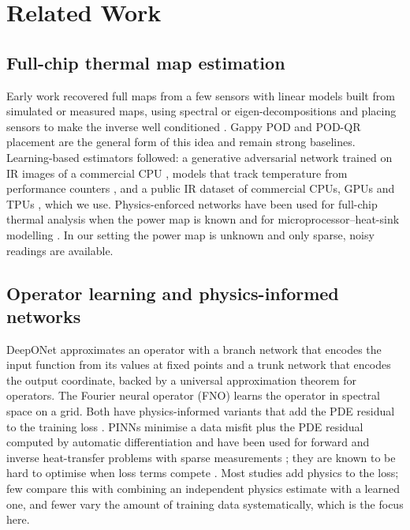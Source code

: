 \documentclass[journal]{IEEEtran}
\begin{document}
\section{Related Work}\label{sec:related}

\subsection{Full-chip thermal map estimation}
Early work recovered full maps from a few sensors with linear models built from simulated or measured maps, using spectral or eigen-decompositions and placing sensors to make the inverse well conditioned \cite{nowroz2010thermal,ranieri2012eigenmaps}.
Gappy POD \cite{everson1995gappy,willcox2006gappy} and POD-QR placement \cite{manohar2018sensor} are the general form of this idea and remain strong baselines.
Learning-based estimators followed: a generative adversarial network trained on IR images of a commercial CPU \cite{jin2020gan}, models that track temperature from performance counters \cite{sadiqbatcha2022tracking}, and a public IR dataset of commercial CPUs, GPUs and TPUs \cite{lu2024dataset}, which we use.
Physics-enforced networks have been used for full-chip thermal analysis when the power map is known \cite{chen2023parametric} and for microprocessor--heat-sink modelling \cite{son2023microprocessor}.
In our setting the power map is unknown and only sparse, noisy readings are available.

\subsection{Operator learning and physics-informed networks}
DeepONet \cite{lu2021deeponet} approximates an operator with a branch network that encodes the input function from its values at fixed points and a trunk network that encodes the output coordinate, backed by a universal approximation theorem for operators.
The Fourier neural operator (FNO) \cite{li2021fno} learns the operator in spectral space on a grid.
Both have physics-informed variants that add the PDE residual to the training loss \cite{wang2021pideeponet,li2024pino}.
PINNs \cite{raissi2019pinn} minimise a data misfit plus the PDE residual computed by automatic differentiation and have been used for forward and inverse heat-transfer problems with sparse measurements \cite{cai2021heat}; they are known to be hard to optimise when loss terms compete \cite{wang2021gradient,krishnapriyan2021failure}.
Most studies add physics to the loss; few compare this with combining an independent physics estimate with a learned one, and fewer vary the amount of training data systematically, which is the focus here.
\end{document}
